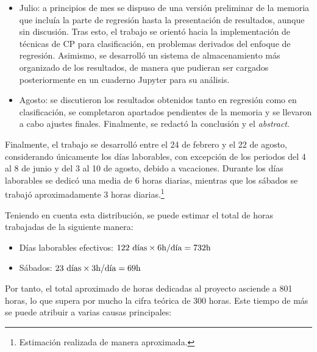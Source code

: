\begin{itemize}
    \item Julio: a principios de mes se dispuso de una versión preliminar de la memoria que incluía la parte de regresión hasta la presentación de resultados, aunque sin discusión. Tras esto, el trabajo se orientó hacia la implementación de técnicas de CP para clasificación, en problemas derivados del enfoque de regresión. Asimismo, se desarrolló un sistema de almacenamiento más organizado de los resultados, de manera que pudieran ser cargados posteriormente en un cuaderno Jupyter para su análisis.

    \item Agosto: se discutieron los resultados obtenidos tanto en regresión como en clasificación, se completaron apartados pendientes de la memoria y se llevaron a cabo ajustes finales. Finalmente, se redactó la conclusión y el \textit{abstract}.
    
\end{itemize}

Finalmente, el trabajo se desarrolló entre el 24 de febrero y el 22 de agosto, considerando únicamente los días laborables, con excepción de los periodos del 4 al 8 de junio y del 3 al 10 de agosto, debido a vacaciones. Durante los días laborables se dedicó una media de 6 horas diarias, mientras que los sábados se trabajó aproximadamente 3 horas diarias.\footnote{Estimación realizada de manera aproximada.}

Teniendo en cuenta esta distribución, se puede estimar el total de horas trabajadas de la siguiente manera:

\begin{itemize}
    \item Días laborables efectivos: $122\textnormal{ días} \times 6\textnormal{h/día} = 732\textnormal{h}$
    \item Sábados: $23\textnormal{ días} \times 3\textnormal{h/día} = 69\textnormal{h}$
\end{itemize}

Por tanto, el total aproximado de horas dedicadas al proyecto asciende a 801 horas, lo que supera por mucho la cifra teórica de 300 horas. Este tiempo de más se puede atribuir a varias causas principales: 

